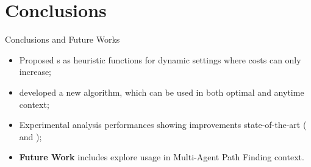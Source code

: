 \section*{Conclusions}

\begin{frame}{Conclusions and Future Works}
    \begin{itemize}
        \item Proposed \CPD{}s as heuristic functions for dynamic settings where costs can only increase;
        \item developed a new algorithm, \CPDSearch{} which can be used in both optimal and anytime context;
        \item Experimental analysis performances showing improvements \wrt{} state-of-the-art (\ALT{} and \AWA{});
        \item \textbf{Future Work} includes explore \CPD{} usage in Multi-Agent Path Finding context.
    \end{itemize}
\end{frame}

\begin{frame}[plain,c]

\begin{center}
\end{center}



\begin{center}
\end{center}

\end{frame}